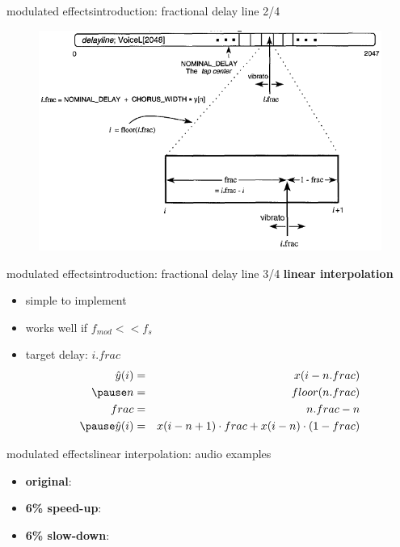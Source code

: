 \begin{frame}{modulated effects}{introduction: fractional delay line 2/4}
	\begin{figure}
		\centerline{\includegraphics[scale=.6]{graph/frac_delay_line}}
	    \label{fig:frac_delay_line}
	\end{figure}
\end{frame}

\begin{frame}{modulated effects}{introduction: fractional delay line 3/4}
	\textbf{linear interpolation}
	\begin{itemize}
		\item	simple to implement
		\item	works well if $f_{mod} << f_s$
	\pause
	\item	target delay: $i.frac$
		\begin{eqnarray*}
			\hat{y}(i) &=& x(i - n.frac)\\
			\pause
			n &=& floor(n.frac)\\
			frac &=& n.frac - n\\
			\pause
			\hat{y}(i) &=& x(i-n + 1)\cdot frac + x(i-n)\cdot (1-frac)
		\end{eqnarray*}
	\end{itemize}
\end{frame}

\begin{frame}{modulated effects}{linear interpolation: audio examples}
    \begin{itemize}
        \item   \textbf{original}: 
        \smallskip
        \item   \textbf{6\% speed-up}: 
        \smallskip
        \item   \textbf{6\% slow-down}: 
    \end{itemize}
\end{frame}

